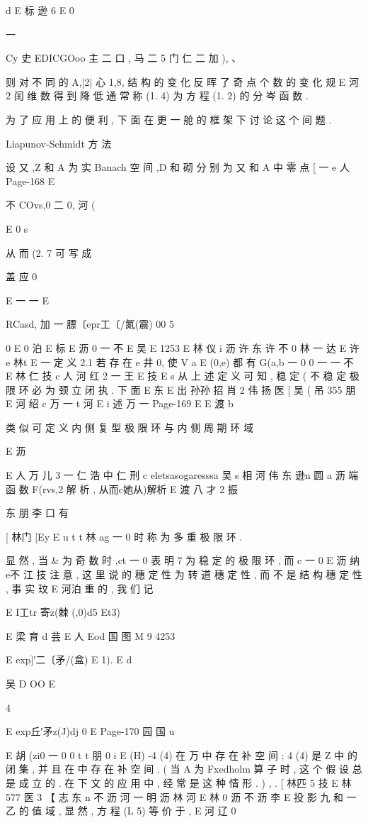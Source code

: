 {{{{{{{{{{{{{{{{{d
E 标 逊 6 E
0

一 {Cy 史 EDICGOoo 主 二 口 , 马 二 5 门 仁 二 加 ),
、

则 对 不 同 的 A,|2| 心 1,8, 结 构 的 变 化 反 晖 了 奇 点 个 数 的 变 化 规
E 河 2
闰 维 数 得 到 降 低 通 常 称 (1. 4) 为 方 程 (1. 2) 的 分 岑 函 数 .

为 了 应 用 上 的 便 利 , 下 面 在 更 一 舱 的 框 架 下 讨 论 这 个 间 题 .

Liapunov-Schmidt 方 法

设 又 ,Z 和 A 为 实 Banach 空 间 ,D 和 砌 分 别 为 又 和 A 中 零 点
[ 一 e 人
Page-168
E

不 COvs,0 二 0,
河 (

E
0 s

从 而 (2. 7 可 写 成

盖 应 0

E 一 一
E

RCasd, 加 一 膘〔epr工〔/氮(震) 00
5

0
E 0 泊
E 标
E 沥 0 一 不
E 吴
E 1253
E 林 仪
i 沥 许 东 许 不 0 林 一 达
E 许 e 林t E 一
定 义 2.1 若 存 在 e 井 0, 使 V a E (0,e) 都 有 G(a,b 一 0
0 一 一 不
E 林 仁 技 c 人 河 红 2 一 王
E 技
E s
从 上 述 定 义 可 知 , 稳 定 ( 不 稳 定 极 限 环 必 为 颈 立 闭 执 . 下 面
E 东
E 出 孙孙 招 肖 2 伟 扬 医 [ 吴 ( 吊 355 朋
E 河 绍 c 万 一 t 河
E i 述 万 一
Page-169
E E 渡
b

类 似 可 定 义 内 侧 复 型 极 限 环 与 内 侧 周 期 环 域

E 沥

E 人 万 儿 3 一 仁 浩 中 仁 刑
c eletsasogaresssa 吴 s 相 河
伟 东 逊n 圆 a 沥
端 函 数 F(rvs,2 解 析 , 从而c她从)解析 E
渡 八 才 2 振

东 朋 李 口
有

[ 林门 [Ey
E u t t 林 ag 一 0
时 称 为 多 重 极 限 环 .

显 然 , 当 & 为 奇 数 时 ,ct 一 0 表 明 7 为 稳 定 的 极 限 环 , 而 c 一 0
E 沥 纳 e不 江 技
注 意 , 这 里 说 的 穗 定 性 为 转 道 穗 定 性 , 而 不 是 结 构 穗 定 性 , 事 实
玟
E 河泊
重 的 , 我 们 记

E I工tr 寄z(棘 (,0)d5 Et3)

E 梁 育 d 芸
E 人
Eod 国 图 M 9 4253

E exp]′二〔矛/(盒) E 1).
E d

吴 D OO
E

4

E exp丘′矛z(J)dj 0
E
Page-170
园 国 u

E
胡 (zi0 一 0 0
t t 朋
0 i
E
(H) -4 (4) 在 万 中 存 在 补 空 间 ; 4 (4) 是 Z 中 的 闭 集 , 并 且
在 中 存 在 补 空 间 . ( 当 A 为 Fxedholm 算 子 时 , 这 个 假 设 总 是 成 立
的 . 在 下 文 的 应 用 中 , 经 常 是 这 种 情 形 . ) , .
[ 林匹 5 技
E 林577 医 3
【 志 东 n 不 沥 河 一 明 沥 林 河
E 林 0 沥 不 沥 李 E
投 影 九 和 一 乙 的 值 域 , 显 然 , 方 程 (L 5) 等 价 于 ,
E 河 辽 0

}}}}}}}}}}}}}}}}}}
